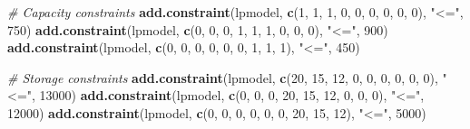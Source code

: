 \documentclass[
]{article}
\newenvironment{Shaded}{\begin{snugshade}}{\end{snugshade}}
\newcommand{\CommentTok}[1]{\textcolor[rgb]{0.56,0.35,0.01}{\textit{#1}}}
\newcommand{\DecValTok}[1]{\textcolor[rgb]{0.00,0.00,0.81}{#1}}
\newcommand{\FunctionTok}[1]{\textcolor[rgb]{0.13,0.29,0.53}{\textbf{#1}}}
\newcommand{\NormalTok}[1]{#1}
\newcommand{\StringTok}[1]{\textcolor[rgb]{0.31,0.60,0.02}{#1}}
\begin{document}
\begin{Shaded}
\begin{Highlighting}[]
\CommentTok{\# Capacity constraints}
\FunctionTok{add.constraint}\NormalTok{(lpmodel, }\FunctionTok{c}\NormalTok{(}\DecValTok{1}\NormalTok{, }\DecValTok{1}\NormalTok{, }\DecValTok{1}\NormalTok{, }\DecValTok{0}\NormalTok{, }\DecValTok{0}\NormalTok{, }\DecValTok{0}\NormalTok{, }\DecValTok{0}\NormalTok{, }\DecValTok{0}\NormalTok{, }\DecValTok{0}\NormalTok{), }\StringTok{"\textless{}="}\NormalTok{, }\DecValTok{750}\NormalTok{)}
\FunctionTok{add.constraint}\NormalTok{(lpmodel, }\FunctionTok{c}\NormalTok{(}\DecValTok{0}\NormalTok{, }\DecValTok{0}\NormalTok{, }\DecValTok{0}\NormalTok{, }\DecValTok{1}\NormalTok{, }\DecValTok{1}\NormalTok{, }\DecValTok{1}\NormalTok{, }\DecValTok{0}\NormalTok{, }\DecValTok{0}\NormalTok{, }\DecValTok{0}\NormalTok{), }\StringTok{"\textless{}="}\NormalTok{, }\DecValTok{900}\NormalTok{)}
\FunctionTok{add.constraint}\NormalTok{(lpmodel, }\FunctionTok{c}\NormalTok{(}\DecValTok{0}\NormalTok{, }\DecValTok{0}\NormalTok{, }\DecValTok{0}\NormalTok{, }\DecValTok{0}\NormalTok{, }\DecValTok{0}\NormalTok{, }\DecValTok{0}\NormalTok{, }\DecValTok{1}\NormalTok{, }\DecValTok{1}\NormalTok{, }\DecValTok{1}\NormalTok{), }\StringTok{"\textless{}="}\NormalTok{, }\DecValTok{450}\NormalTok{)}

\CommentTok{\# Storage constraints}
\FunctionTok{add.constraint}\NormalTok{(lpmodel, }\FunctionTok{c}\NormalTok{(}\DecValTok{20}\NormalTok{, }\DecValTok{15}\NormalTok{, }\DecValTok{12}\NormalTok{, }\DecValTok{0}\NormalTok{, }\DecValTok{0}\NormalTok{, }\DecValTok{0}\NormalTok{, }\DecValTok{0}\NormalTok{, }\DecValTok{0}\NormalTok{, }\DecValTok{0}\NormalTok{), }\StringTok{"\textless{}="}\NormalTok{, }\DecValTok{13000}\NormalTok{)}
\FunctionTok{add.constraint}\NormalTok{(lpmodel, }\FunctionTok{c}\NormalTok{(}\DecValTok{0}\NormalTok{, }\DecValTok{0}\NormalTok{, }\DecValTok{0}\NormalTok{, }\DecValTok{20}\NormalTok{, }\DecValTok{15}\NormalTok{, }\DecValTok{12}\NormalTok{, }\DecValTok{0}\NormalTok{, }\DecValTok{0}\NormalTok{, }\DecValTok{0}\NormalTok{), }\StringTok{"\textless{}="}\NormalTok{, }\DecValTok{12000}\NormalTok{)}
\FunctionTok{add.constraint}\NormalTok{(lpmodel, }\FunctionTok{c}\NormalTok{(}\DecValTok{0}\NormalTok{, }\DecValTok{0}\NormalTok{, }\DecValTok{0}\NormalTok{, }\DecValTok{0}\NormalTok{, }\DecValTok{0}\NormalTok{, }\DecValTok{0}\NormalTok{, }\DecValTok{20}\NormalTok{, }\DecValTok{15}\NormalTok{, }\DecValTok{12}\NormalTok{), }\StringTok{"\textless{}="}\NormalTok{, }\DecValTok{5000}\NormalTok{)}


\end{Highlighting}
\end{Shaded}
\end{document}
